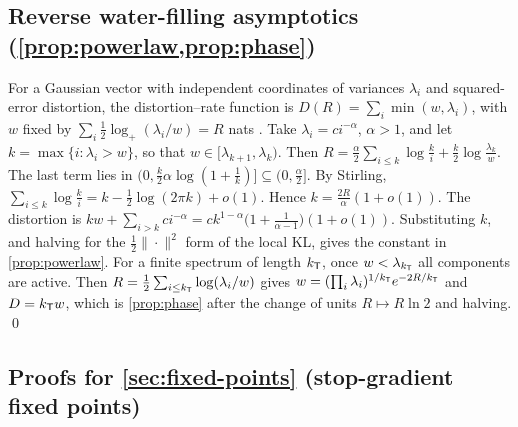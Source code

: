 \subsection{Reverse water-filling asymptotics (\cref{prop:powerlaw,prop:phase})}

For a Gaussian vector with independent coordinates of variances $\lambda_i$ and squared-error distortion,
the distortion--rate function is $D(R)=\sum_i\min(w,\lambda_i)$, with $w$ fixed by
$\sum_i\frac12\log_+(\lambda_i/w)=R$ nats \citep[Thm.~10.3.3]{cover2006elements}. Take $\lambda_i=ci^{-\alpha}$, $\alpha>1$, and
let $k=\max\{i:\lambda_i>w\}$, so that $w\in[\lambda_{k+1},\lambda_k)$. Then
$R=\frac\alpha2\sum_{i\le k}\log\frac ki+\frac k2\log\frac{\lambda_k}w$. The last term lies in
$(0,\frac k2\alpha\log(1+\frac1k)]\subseteq(0,\frac\alpha2]$. By Stirling,
$\sum_{i\le k}\log\frac ki=k-\frac12\log(2\pi k)+o(1)$. Hence $k=\frac{2R}\alpha(1+o(1))$. The distortion
is $kw+\sum_{i>k}ci^{-\alpha}=ck^{1-\alpha}\big(1+\frac1{\alpha-1}\big)(1+o(1))$. Substituting $k$, and halving for the
$\frac12\|\cdot\|^2$ form of the local KL, gives the constant in \cref{prop:powerlaw}. For a finite spectrum of length
$k_{\mathsf{T}}$, once $w<\lambda_{k_{\mathsf{T}}}$ all components are active. Then
$R=\frac12\sum_{i\le k_{\mathsf{T}}}\log(\lambda_i/w)$ gives $w=(\prod_i\lambda_i)^{1/k_{\mathsf{T}}}e^{-2R/k_{\mathsf{T}}}$ and $D=k_{\mathsf{T}} w$, which is
\cref{prop:phase} after the change of units $R\mapsto R\ln2$ and halving. \qed

\subsection{Proofs for \cref{sec:fixed-points} (stop-gradient fixed points)}\label{app:fixed-points}

